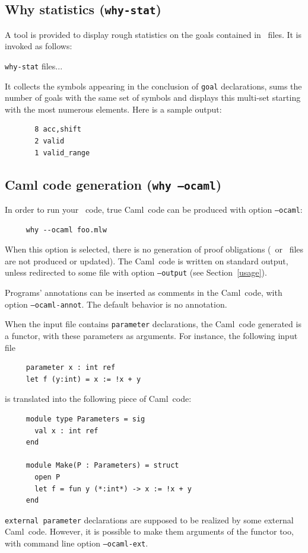 \documentclass[a4paper,12pt]{report}
\makeatletter
\newcommand{\caml}{\textsf{Caml}}
\newcommand{\indextt}[1]{\index{#1@\texttt{#1}}}
\makeatother
\begin{document}
\subsection{Why statistics (\texttt{why-stat})}
\indextt{why-stat}
A tool is provided to display rough statistics on the goals contained
in \why\ files. It is invoked as follows:
\begin{center}
  \texttt{why-stat} files...
\end{center}
It collects the symbols appearing in the conclusion of 
\texttt{goal} declarations, sums the number of goals with the same set
of symbols and displays this multi-set starting with the most numerous
elements. Here is a sample output:
\begin{verbatim}
       8 acc,shift
       2 valid
       1 valid_range
\end{verbatim}

\subsection{Caml code generation (\texttt{why --ocaml})}
\label{ocamlcode}
In order to run your \why\ code, true \caml\ code can be
produced with option \texttt{--ocaml}: 
\begin{verbatim}
     why --ocaml foo.mlw
\end{verbatim}
When this option is selected, there is no generation of proof
obligations (\coq\ or \pvs\ files are not produced or updated).
The \caml\ code is written on standard output, unless redirected to
some file with option \texttt{--output} (see Section~\ref{usage}).

Programs' annotations can be inserted as comments in the \caml\ code,
with option \texttt{--ocaml-annot}. The default behavior is no
annotation. 

When the input file contains \texttt{parameter} declarations, the
\caml\ code generated is a functor, with these parameters as
arguments. For instance, the following input file
\begin{verbatim}
     parameter x : int ref
     let f (y:int) = x := !x + y
\end{verbatim}
is translated into the following piece of \caml\ code:
\begin{verbatim}
     module type Parameters = sig
       val x : int ref
     end

     module Make(P : Parameters) = struct
       open P
       let f = fun y (*:int*) -> x := !x + y
     end
\end{verbatim}
\texttt{external parameter} declarations are supposed to be realized by some
external \caml\ code. However, it is possible to make them arguments
of the functor too, with command line option \texttt{--ocaml-ext}.
\end{document}
